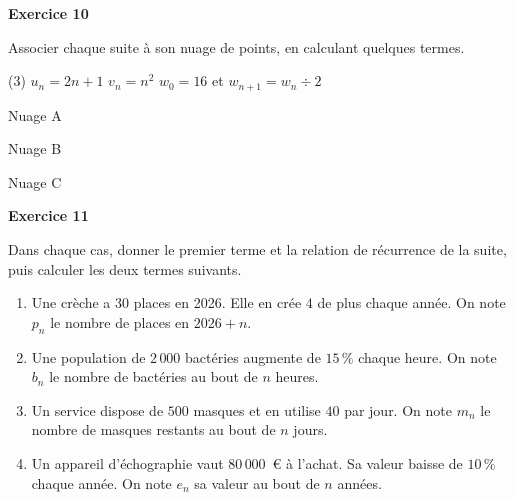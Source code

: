 \documentclass[a4paper,11pt]{article}
\newenvironment{exercice}[1]{%
  \Needspace{6\baselineskip}\par\bigskip\noindent\textbf{Exercice #1}\par\smallskip\noindent\ignorespaces
}{%
  \par
}
\newcommand{\grille}[4]{%
  \draw[very thin, gray!40, xstep=1, ystep=#4] (0,0) grid (#1,#2);
  \draw[->] (0,0) -- ({#1+0.5},0) node[right] {\small $n$};
  \draw[->] (0,0) -- (0,#2) -- ++(0,0.4cm);
  \foreach \x in {1,...,#1} \node[below] at (\x,0) {\scriptsize $\x$};
  \foreach \y in {#3} \node[left] at (0,\y) {\scriptsize $\y$};
  \node[below left] at (0,0) {\scriptsize $0$};
}
\begin{document}
\begin{exercice}{10}
Associer chaque suite à son nuage de points, en calculant quelques termes.
\begin{tasks}(3)
\task $u_n = 2n + 1$
\task $v_n = n^2$
\task $w_0 = 16$ et $w_{n+1} = w_n \div 2$
\end{tasks}

\medskip
\noindent
\begin{minipage}[t]{0.32\linewidth}
\centering
Nuage A

\end{minipage}
\hfill
\begin{minipage}[t]{0.32\linewidth}
\centering
Nuage B

\end{minipage}
\hfill
\begin{minipage}[t]{0.32\linewidth}
\centering
Nuage C

\end{minipage}
\end{exercice}

\begin{exercice}{11}
Dans chaque cas, donner le premier terme et la relation de récurrence de la suite, puis calculer les deux termes suivants.
\begin{enumerate}[label=\arabic*.]
\item Une crèche a $30$ places en 2026. Elle en crée $4$ de plus chaque année. On note $p_n$ le nombre de places en $2026 + n$.
\item Une population de $2\,000$ bactéries augmente de $15\,\%$ chaque heure. On note $b_n$ le nombre de bactéries au bout de $n$ heures.
\item Un service dispose de $500$ masques et en utilise $40$ par jour. On note $m_n$ le nombre de masques restants au bout de $n$ jours.
\item Un appareil d'échographie vaut $80\,000$~€ à l'achat. Sa valeur baisse de $10\,\%$ chaque année. On note $e_n$ sa valeur au bout de $n$ années.
\end{enumerate}
\end{exercice}
\end{document}
